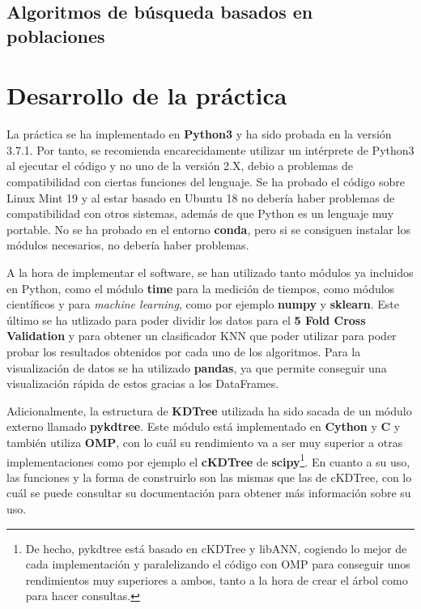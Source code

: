 \documentclass[11pt,a4paper]{article}
\begin{document}
\subsection{Algoritmos de búsqueda basados en poblaciones}

\newpage

\section{Desarrollo de la práctica}

La práctica se ha implementado en \textbf{Python3} y ha sido probada en la versión 3.7.1. Por tanto, se recomienda
encarecidamente utilizar un intérprete de Python3 al ejecutar el código y no uno de la versión 2.X, debio a problemas
de compatibilidad con ciertas funciones del lenguaje. Se ha probado el código sobre Linux Mint 19 y al estar basado en
Ubuntu 18 no debería haber problemas de compatibilidad con otros sistemas, además de que Python es un lenguaje muy portable.
No se ha probado en el entorno \textbf{conda}, pero si se consiguen instalar los módulos necesarios, no debería haber
problemas.

A la hora de implementar el software, se han utilizado tanto módulos ya incluidos en Python, como el módulo \textbf{time}
para la medición de tiempos, como módulos científicos y para \textit{machine learning}, como por ejemplo \textbf{numpy} y
\textbf{sklearn}. Este último se ha utlizado para poder dividir los datos para el \textbf{5 Fold Cross Validation}
y para obtener un clasificador KNN que poder utilizar para poder probar los resultados obtenidos por cada uno de los
algoritmos. Para la visualización de datos se ha utilizado \textbf{pandas}, ya que permite conseguir una visualización rápida
de estos gracias a los DataFrames.

Adicionalmente, la estructura de \textbf{KDTree} utilizada ha sido sacada de un módulo externo llamado
\textbf{pykdtree}\cite{pykdtree}. Este módulo está implementado en \textbf{Cython} y \textbf{C} y también utiliza
\textbf{OMP}, con lo cuál su rendimiento va a ser muy superior a otras implementaciones como por ejemplo el \textbf{cKDTree}
de \textbf{scipy}\footnote{De hecho, pykdtree está basado en cKDTree y libANN, cogiendo lo
mejor de cada implementación y paralelizando el código con OMP para conseguir unos rendimientos muy superiores a ambos,
tanto a la hora de crear el árbol como para hacer consultas.}. En cuanto a su uso, las funciones y la forma de construirlo
son las mismas que las de cKDTree, con lo cuál se puede consultar su documentación\cite{ckdtree} para obtener más información
sobre su uso.
\end{document}
